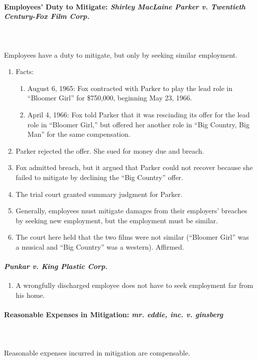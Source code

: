 \paragraph{Employees' Duty to Mitigate: \emph{Shirley MacLaine Parker v. 
Twentieth Century-Fox Film Corp.}}
~\\\\
Employees have a duty to mitigate, but only by seeking similar employment.

\begin{enumerate}
    \item Facts:
    \begin{enumerate}
        \item August 6, 1965: Fox contracted with Parker to play the lead role 
        in ``Bloomer Girl'' for \$750,000, beginning May 23, 1966.
        \item April 4, 1966: Fox told Parker that it was rescinding its offer 
        for the lead role in ``Bloomer Girl,'' but offered her another role in 
        ``Big Country, Big Man'' for the same compensation.
    \end{enumerate}
    \item Parker rejected the offer. She sued for money due and breach.
    \item Fox admitted breach, but it argued that Parker could not recover 
    because she failed to mitigate by declining the ``Big Country'' offer.
    \item The trial court granted summary judgment for Parker.
    \item Generally, employees must mitigate damages from their employers' 
    breaches by seeking new employment, but the employment must be similar.
    \item The court here held that the two films were not similar (``Bloomer 
    Girl'' was a musical and ``Big Country'' was a western). Affirmed.
\end{enumerate}

\paragraph{\emph{Punkar v. King Plastic Corp.}}

\begin{enumerate}
    \item A wrongfully discharged employee does not have to seek employment 
    far from his home.
\end{enumerate}

\paragraph{Reasonable Expenses in Mitigation: \emph{mr. eddie, inc. v. 
ginsberg}}
~\\\\
Reasonable expenses incurred in mitigation are compensable.

